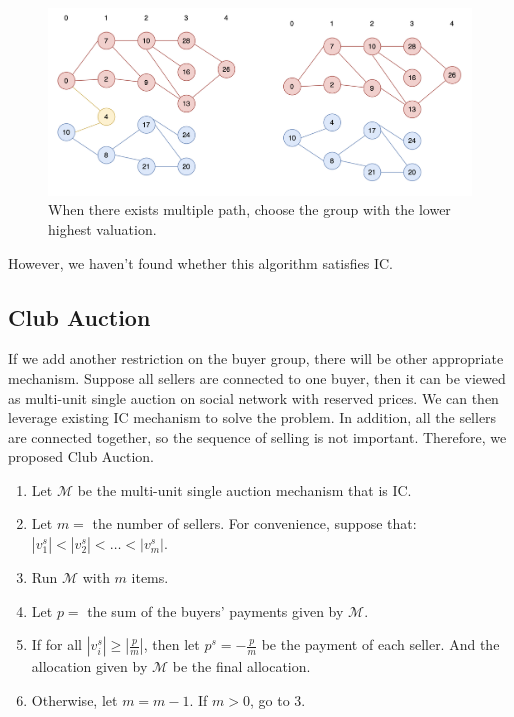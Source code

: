 \documentclass[format=acmsmall, review=false, natbib=false]{acmart}
\begin{document}
\begin{figure}
	\centering
	\includegraphics[width = \textwidth]{image/Graph03.png}
	\caption{When there exists multiple path, choose the group with the lower highest valuation.}
	\label{fig:GraphDivision3}
\end{figure}
However, we haven't found whether this algorithm satisfies IC.

\subsection{Club Auction}
If we add another restriction on the buyer group, there will be other appropriate mechanism. Suppose all sellers are connected to one buyer, then it can be viewed as multi-unit single auction on social network with reserved prices. We can then leverage existing IC mechanism to solve the problem. In addition, all the sellers are connected together, so the sequence of selling is not important. Therefore, we proposed Club Auction.
\begin{tcolorbox}[title=Algorithm: Club Auction]
	\begin{enumerate}
		\item Let \(\mathcal{M}\) be the multi-unit single auction mechanism that is IC.
		\item Let \(m = \) the number of sellers. For convenience, suppose that: \(|v^s_1| < |v^s_2| < \ldots < |v^s_m|\).
		\item Run \(\mathcal M\) with \(m\) items.
		\item Let \(p = \) the sum of the buyers' payments given by \(\mathcal M\).
		\item If for all \(|v^s_i| \geq \left|\frac p m\right|\), then let \(p^s = -\frac p m\) be the payment of each seller. And the allocation given by \(\mathcal M\) be the final allocation.
		\item Otherwise, let \(m = m - 1\). If \(m > 0\), go to 3.
	\end{enumerate}
\end{tcolorbox}
\end{document}
